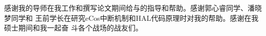 
\begin{ack}

感谢我的导师在我工作和撰写论文期间给与的指导和帮助。感谢郭心睿同学、潘晓梦同学和
王前学长在研究eCos中断机制和HAL代码原理时对我的帮助。感谢在我硕士期间和我一起奋
斗各个战场的战友们。

\end{ack}